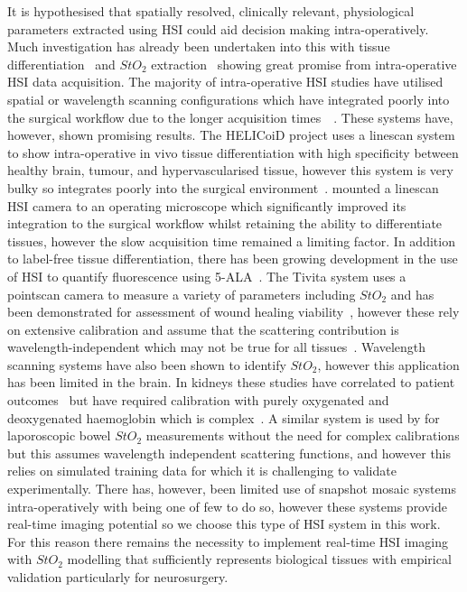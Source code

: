 It is hypothesised that spatially resolved, clinically relevant, physiological parameters extracted using HSI could aid decision making intra-operatively. Much investigation has already been undertaken into this with tissue differentiation~\citep{Kabwama2016, Fabelo2019, Kho2019, Giannantonio2023} and $StO_2$ extraction~\citep{Yudovsky2015, Clancy2015, WOS:000360241100026, Wirkert2016, Clancy2020, Thoenissen2023} showing great promise from intra-operative HSI data acquisition. The majority of intra-operative HSI studies have utilised spatial or wavelength scanning configurations which have integrated poorly into the surgical workflow due to the longer acquisition times~~\citep{Shapey2019, MacCormac2023, Fabelo2019}. These systems have, however, shown promising results. The HELICoiD project uses a linescan system to show intra-operative in vivo tissue differentiation with high specificity between healthy brain, tumour, and hypervascularised tissue, however this system is very bulky so integrates poorly into the surgical environment~\citep{Fabelo2019, Fabelo2019a, Kabwama2016}. \citet{Giannantonio2023} mounted a linescan HSI camera to an operating microscope which significantly improved its integration to the surgical workflow whilst retaining the ability to differentiate tissues, however the slow acquisition time remained a limiting factor. In addition to label-free tissue differentiation, there has been growing development in the use of HSI to quantify fluorescence using 5-ALA~\citep{Walke2023}. The Tivita system uses a pointscan camera to measure a variety of parameters including $StO_2$ and has been demonstrated for assessment of wound healing viability~\citep{Thoenissen2023}, however these rely on extensive calibration and assume that the scattering contribution is wavelength-independent which may not be true for all tissues~\citep{Holmer2018, Jacques2013}. Wavelength scanning systems have also been shown to identify $StO_2$, however this application has been limited in the brain. In kidneys these studies have correlated to patient outcomes~\citep{Liu2013} but have required calibration with purely oxygenated and deoxygenated haemoglobin which is complex~\citep{Zuzak2002}. A similar system is used by \citet{Clancy2015} for laporoscopic bowel $StO_2$ measurements without the need for complex calibrations but this assumes wavelength independent scattering functions, and \citep{Wirkert2016} however this relies on simulated training data for which it is challenging to validate experimentally. There has, however, been limited use of snapshot mosaic systems intra-operatively with \citet{Pichette2016} being one of few to do so, however these systems provide real-time imaging potential so we choose this type of HSI system in this work. For this reason there remains the necessity to implement real-time HSI imaging with $StO_2$ modelling that sufficiently represents biological tissues with empirical validation particularly for neurosurgery. 

